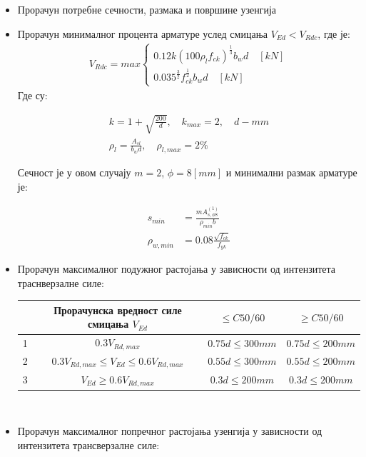 \documentclass[11pt, a4paper]{article}
\begin{document}
\begin{enumerate}
\begin{itemize}
\begin{itemize}
		
		\item Прорачун потребне сечности, размака и површине узенгија 
		\item Прорачун минималног процента арматуре услед смицања $V_{Ed} < V_{Rdc}$, где је:
			\begin{align*}
				V_{Rdc} =	 max \left\{\begin{array}{l}
				0.12k(100\rho_lf_{ck})^{\frac{1}{3}}b_{w}d \quad [kN]\\
				0.035^{\frac{3}{2}}f_{ck}^{\frac{1}{2}}b_{w}d  \quad [kN]
				\end{array} \right.
			\end{align*}
			Где су:
			
			\begin{align*}
				k = 1 + \sqrt{\frac{200}{d}}, \quad k_{max} = 2, \quad d - mm\\
				\rho_l = \frac{A_{sl}}{b_wd}, \quad \rho_{l,max} = 2 \%
			\end{align*}
			
			Сечност је у овом случају $m = 2$, $\phi = 8 [mm]$ и минимални размак арматуре је:
			
			\begin{align*}
			s_{min} &= \frac{mA_{s, \phi 8}^{(1)}}{\rho_{min}b} \\
			\rho_{w, min} &= 0.08\frac{\sqrt{f_{ck}}}{f_{yk}}
			\end{align*}
			
		\item Прорачун максималног подужног растојања у зависности од интензитета траснверзалне силе:\\
		
			\begin{tabular}{|c|c|c|c|} \hline
				 &Прорачунска вредност силе смицања $V_{Ed}$ & $\leq C50/60$ & $\geq C50/60$\\ \hline
				 1 & $0.3V_{Rd,max}$ & $0.75d \leq 300mm$ & $0.75d \leq 200mm $\\ \hline
				2 & $0.3V_{Rd,max} \leq V_{Ed} \leq  0.6V_{Rd,max}$& $0.55d \leq 300mm$ & $0.55d \leq 200mm$\\ \hline
				3 &$V_{Ed} \geq 0.6V_{Rd,max} $ & $0.3d \leq 200mm$  & $0.3d \leq 200mm$\\ \hline
			\end{tabular}\\[2mm]
					
		\item Прорачун максималног попречног растојања узенгија у зависности од интензитета трансверзалне силе:\\
		

\end{itemize}
\end{itemize}
\end{enumerate}
\end{document}
